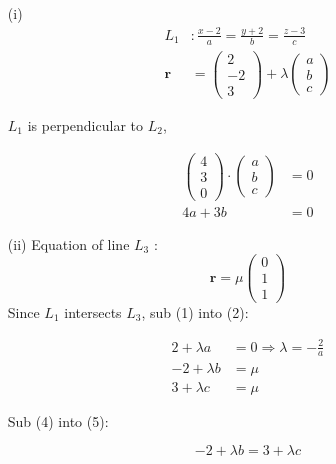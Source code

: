 \item {}
\begin{enumerate}
\item[(i)]  
\begin{align}
L_{1} & :\frac{x-2}{a}=\frac{y+2}{b}=\frac{z-3}{c}\nonumber \\
\mathbf{r} & =\left(\begin{array}{c}
2\\
-2\\
3
\end{array}\right)+\lambda\left(\begin{array}{c}
a\\
b\\
c
\end{array}\right)
\end{align}

$L_{1}$ is perpendicular to $L_{2}$, 

\begin{align*}
\left(\begin{array}{c}
4\\
3\\
0
\end{array}\right)\cdot\left(\begin{array}{c}
a\\
b\\
c
\end{array}\right) & =0\\
4a+3b & =0
\end{align*}

\item[(ii)]  Equation of line $L_{3}$ : 
\begin{equation}
\mathbf{r}=\mu\left(\begin{array}{c}
0\\
1\\
1
\end{array}\right)
\end{equation}
Since $L_{1}$ intersects $L_{3}$, sub (1) into (2):

\begin{align}
2+\lambda a & =0\Rightarrow\lambda=-\frac{2}{a}\\
-2+\lambda b & =\mu\\
3+\lambda c & =\mu
\end{align}

Sub (4) into (5): 

\begin{equation}
-2+\lambda b=3+\lambda c
\end{equation}


\end{enumerate}
